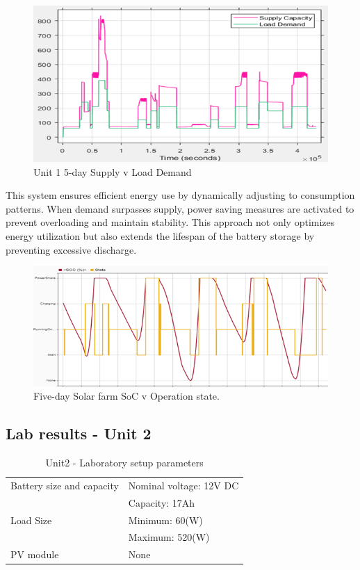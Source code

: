 \begin{figure}[H]
	\centering
	\includegraphics[totalheight=8cm]{Figures/Unit 1 5-day Supply v Load Demand.png}
	\caption{Unit 1 5-day Supply v Load Demand}
\end{figure} 
This system ensures efficient energy use by dynamically adjusting to consumption patterns. When demand surpasses supply, power saving measures are activated to prevent overloading and maintain stability. This approach not only optimizes energy utilization but also extends the lifespan of the battery storage by preventing excessive discharge.

\begin{figure}[H]
	\centering
	\includegraphics[totalheight=6cm]{Figures/five-day Solar farm SoC v Operation state.png}
	\caption{Five-day Solar farm SoC v Operation state.}
\end{figure} 

\subsection{Lab results - Unit 2}
\begin{table}[!ht]
	\begin{center}
		\caption{Unit2 - Laboratory setup parameters}
		\begin{tabular}{|p{6cm}|p{8cm}|} %
			\hline
			Battery size and capacity	& Nominal voltage: 12V DC \\
			& Capacity: 17Ah\\
			\hline
			Load Size 					& Minimum: 60(W)\\
			& Maximum: 520(W)\\
			\hline
			PV module		 			& None\\
			\hline
		\end{tabular}
	\end{center}
\end{table}

